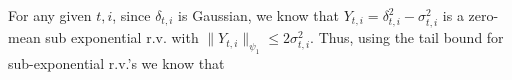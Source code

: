 \documentclass[10pt]{article}
\begin{document}
%
For any given $t,i$, since $\delta_{t,i}$ is Gaussian, we know that $Y_{t,i} = \delta_{t,i}^2 - \sigma_{t,i}^2$ is a zero-mean sub exponential r.v. with $\|Y_{t,i}\|_{\psi_1} \leq 2 \sigma_{t,i}^2$. Thus, using the tail bound for sub-exponential r.v.'s we know that
%
%
%
%
\end{document}
